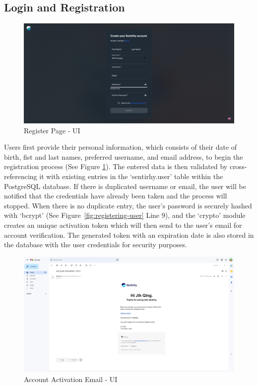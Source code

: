 \subsection{Login and Registration}
\begin{figure}[ht!]
    \centering
    \includegraphics[width=14cm]{Images/register-ui.png}
    \caption{Register Page - UI}
    \label{fig:register-page-ui}
\end{figure}
Users first provide their personal information, which consists of their date of birth, fist and last names, preferred username, and email address, to begin the registration process (See Figure \ref{fig:register-page-ui}).
The entered data is then validated by cross-referencing it with existing entries in the `sentirhy.user' table within the PostgreSQL database.
If there is duplicated username or email, the user will be notified that the credentials have already been taken and the process will stopped.
When there is no duplicate entry, the user's password is securely hashed with `bcrypt' (See Figure~\ref{fig:registering-user} Line 9), and the `crypto' module creates an unique activation token which will then send to the user's email for account verification.
The generated token with an expiration date is also stored in the database with the user credentials for security purposes. 
\begin{figure}[ht!]
    \centering
    \includegraphics[width=14cm]{Images/acc-activation.png}
    \caption{Account Activation Email - UI}
    \label{fig:account-activation-ui}
\end{figure}
